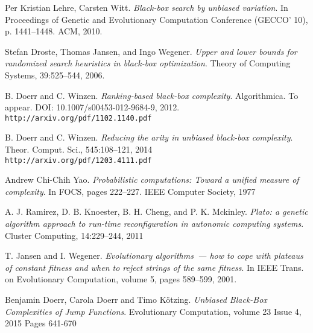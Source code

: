 \documentclass[specification,annotation,times]{itmo-student-thesis}
\begin{document}
\tableofcontents


\startthechapters








\begin{thebibliography}{9}
 Per Kristian Lehre, Carsten Witt. \textit{Black-box search by unbiased variation}. In Proceedings of Genetic and Evolutionary Computation Conference (GECCO’ 10), p. 1441--1448. ACM, 2010.

 Stefan Droste, Thomas Jansen, and Ingo Wegener. \textit{Upper and lower bounds for randomized search heuristics in black-box optimization}. Theory of Computing Systems, 39:525--544, 2006.

 B. Doerr and C. Winzen. \textit{Ranking-based black-box complexity}. Algorithmica. To appear. DOI: 10.1007/s00453-012-9684-9, 2012. \\\texttt{http://arxiv.org/pdf/1102.1140.pdf}

 B. Doerr and C. Winzen. \textit{Reducing the arity in unbiased black-box complexity}. Theor. Comput. Sci., 545:108--121, 2014 \\\texttt{http://arxiv.org/pdf/1203.4111.pdf}

 Andrew Chi-Chih Yao. \textit{Probabilistic computations: Toward a unified measure of complexity}. In FOCS, pages 222--227. IEEE Computer Society, 1977

 A. J. Ramirez, D. B. Knoester, B. H. Cheng, and P. K. Mckinley. \textit{Plato: a genetic algorithm approach to run-time reconfiguration in autonomic computing systems}. Cluster Computing, 14:229--244, 2011

 T. Jansen and I. Wegener. \textit{Evolutionary algorithms~--- how to cope with plateaus of constant fitness and when to reject strings of the same fitness}. In IEEE Trans. on Evolutionary Computation, volume 5, pages 589--599, 2001.

 Benjamin Doerr, Carola Doerr and Timo Kötzing. \textit{Unbiased Black-Box Complexities of Jump Functions}. Evolutionary Computation, volume 23 Issue 4, 2015 Pages 641-670 


\end{thebibliography}
\end{document}
